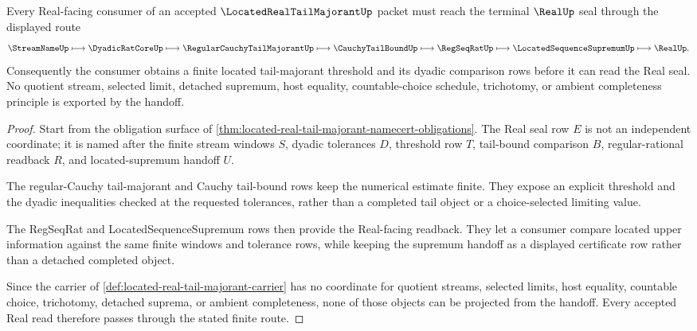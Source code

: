 \begin{theorem}
\label{thm:located-real-tail-majorant-real-handoff}
Every Real-facing consumer of an accepted $\LocatedRealTailMajorantUp$ packet must reach the terminal $\RealUp$ seal through the displayed route
$$
\StreamNameUp \longmapsto \DyadicRatCoreUp \longmapsto \RegularCauchyTailMajorantUp \longmapsto \CauchyTailBoundUp \longmapsto \RegSeqRatUp \longmapsto \LocatedSequenceSupremumUp \longmapsto \RealUp .
$$
Consequently the consumer obtains a finite located tail-majorant threshold and its dyadic comparison rows before it can read the Real seal. No quotient stream, selected limit, detached supremum, host equality, countable-choice schedule, trichotomy, or ambient completeness principle is exported by the handoff.
\end{theorem}
\begin{proof}
Start from the obligation surface of \autoref{thm:located-real-tail-majorant-namecert-obligations}. The Real seal row $E$ is not an independent coordinate; it is named after the finite stream windows $S$, dyadic tolerances $D$, threshold row $T$, tail-bound comparison $B$, regular-rational readback $R$, and located-supremum handoff $U$.

The regular-Cauchy tail-majorant and Cauchy tail-bound rows keep the numerical estimate finite. They expose an explicit threshold and the dyadic inequalities checked at the requested tolerances, rather than a completed tail object or a choice-selected limiting value.

The RegSeqRat and LocatedSequenceSupremum rows then provide the Real-facing readback. They let a consumer compare located upper information against the same finite windows and tolerance rows, while keeping the supremum handoff as a displayed certificate row rather than a detached completed object.

Since the carrier of \autoref{def:located-real-tail-majorant-carrier} has no coordinate for quotient streams, selected limits, host equality, countable choice, trichotomy, detached suprema, or ambient completeness, none of those objects can be projected from the handoff. Every accepted Real read therefore passes through the stated finite route.
\end{proof}


